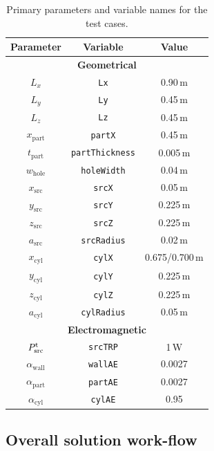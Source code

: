 \documentclass[a4paper]{article}
\numberwithin{equation}{section}
\begin{document}
\begin{table}[ht]
\begin{center}
\begin{tabular}{|c|c|c|}
\hline
\textbf{Parameter}     &\textbf{Variable}      & \textbf{Value} \\
\hline
\multicolumn{3}{|c|}{\textbf{Geometrical}} \\
\hline
$L_x$                  &\texttt{Lx}            &0.90\,m \\
$L_y$                  &\texttt{Ly}            &0.45\,m \\
$L_z$                  &\texttt{Lz}            &0.45\,m \\
$x_\mathrm{part}$      &\texttt{partX}         &0.45\,m \\
$t_\mathrm{part}$      &\texttt{partThickness} &0.005\,m \\
$w_\mathrm{hole}$      &\texttt{holeWidth}     &0.04\,m \\
$x_\mathrm{src}$       &\texttt{srcX}          &0.05\,m \\
$y_\mathrm{src}$       &\texttt{srcY}          &0.225\,m \\
$z_\mathrm{src}$       &\texttt{srcZ}          &0.225\,m \\
$a_\mathrm{src}$       &\texttt{srcRadius}     &0.02\,m \\
$x_\mathrm{cyl}$       &\texttt{cylX}          &0.675/{\color{red}0.700\,m} \\
$y_\mathrm{cyl}$       &\texttt{cylY}          &0.225\,m \\
$z_\mathrm{cyl}$       &\texttt{cylZ}          &0.225\,m \\
$a_\mathrm{cyl}$       &\texttt{cylRadius}     &0.05\,m \\
\hline
\multicolumn{3}{|c|}{\textbf{Electromagnetic}} \\
\hline
$P^{\mathrm{t}}_\mathrm{src}$   &\texttt{srcTRP}        &1\,W \\
$\alpha_\mathrm{wall}$ &\texttt{wallAE}        &0.0027 \\
$\alpha_\mathrm{part}$ &\texttt{partAE}        &0.0027 \\
$\alpha_\mathrm{cyl}$  &\texttt{cylAE}         &0.95 \\
\hline
\end{tabular}
\end{center}
\caption{\label{tb:tcparam} Primary parameters and variable names for the test cases.}
\end{table}

\subsection[Overall solution work-flow]{Overall solution work-flow}
\label{sc:tcs:workflow}
\end{document}
